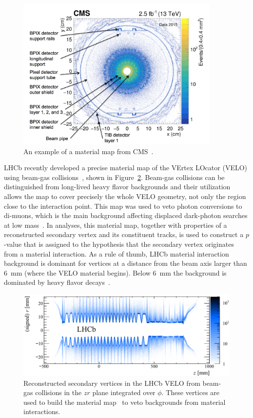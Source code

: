 %
\begin{figure}[t]
  \centering
   \includegraphics[width=0.9\textwidth]{figures/cmsmaterial.png}
  \caption{An example of a material map from CMS~\cite{Sirunyan:2018icq}.
  }
  \label{fig:materialmapCMS}
\end{figure}

LHCb recently developed a precise material map of the VErtex LOcator (VELO) using beam-gas collisions~\cite{Alexander:2018png}, shown in Figure~\ref{fig:lhcbmaterialmap}. Beam-gas collisions can be distinguished from long-lived heavy flavor backgrounds and their utilization allows the map to cover precisely the whole VELO geometry, not only the region close to the interaction point. This map was used to veto photon conversions to di-muons, which is the main background affecting displaced dark-photon searches at low mass~\cite{Aaij:2017rft}. In analyses, this material map, together with properties of a reconstructed secondary vertex and its constituent tracks, is used to construct a $p$-value that is assigned to the hypothesis that the secondary vertex originates from a material interaction. As a rule of thumb, LHCb material interaction background is dominant for vertices at a distance from the beam axis larger than 6~mm (where the VELO material begins). Below 6~mm the background is dominated by heavy flavor decays~\cite{Ilten:2016tkc}.

\begin{figure}[t]
  \centering
  \includegraphics[width=\textwidth]{figures/lhcbmaterial.pdf}
  \caption{Reconstructed secondary vertices in the LHCb VELO from beam-gas collisions in the $zr$ plane integrated over $\phi$. These vertices are used to build the material map~\cite{Alexander:2018png} to veto backgrounds from material interactions.
  }
  \label{fig:lhcbmaterialmap}
\end{figure}

